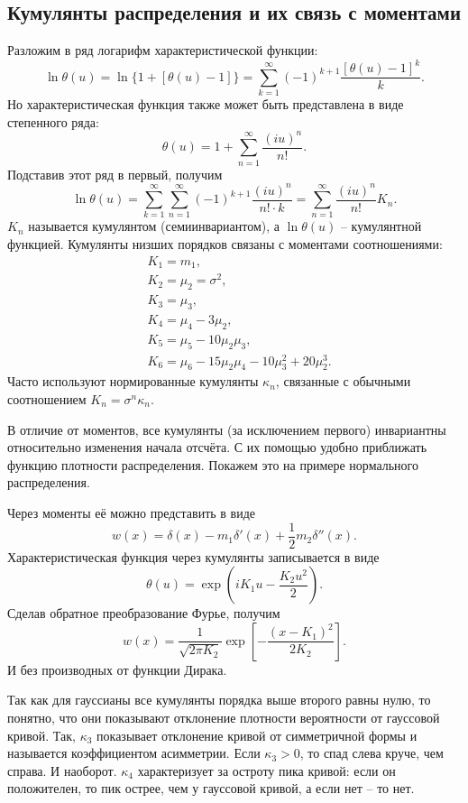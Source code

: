 \subsection{Кумулянты распределения и их связь с моментами}
Разложим в ряд логарифм характеристической функции:
\[
    \ln\theta(u) = \ln\{1 + [\theta(u) - 1]\} = \sum_{k=1}^\infty
    (-1)^{k+1}\frac{[\theta(u) - 1]^k}{k}.
\]
Но характеристическая функция также может быть представлена в виде степенного
ряда:
\[
    \theta(u) = 1 + \sum_{n=1}^\infty \frac{(iu)^n}{n!}.
\]
Подставив этот ряд в первый, получим
\[
    \ln\theta(u) = \sum_{k=1}^\infty \sum_{n=1}^\infty
    (-1)^{k+1}\frac{(iu)^n}{n! \cdot k} =
    \sum_{n=1}^\infty\frac{(iu)^n}{n!}K_n.
\]
\( K_n \) называется кумулянтом (семиинвариантом), а \( \ln\theta(u) \) --
кумулянтной функцией. Кумулянты низших порядков связаны с моментами
соотношениями:
\begin{align*}
    & K_1 = m_1, \\
    & K_2 = \mu_2 = \sigma^2, \\
    & K_3 = \mu_3, \\
    & K_4 = \mu_4 - 3\mu_2, \\
    & K_5 = \mu_5 - 10\mu_2\mu_3, \\
    & K_6 = \mu_6 - 15\mu_2\mu_4 - 10\mu_3^2 + 20\mu_2^3.
\end{align*}
Часто используют нормированные кумулянты \( \kappa_n \), связанные с обычными
соотношением \( K_n = \sigma^n\kappa_n \).

В отличие от моментов, все кумулянты (за исключением первого) инвариантны
относительно изменения начала отсчёта. С их помощью удобно приближать функцию
плотности распределения. Покажем это на примере нормального распределения.

Через моменты её можно представить в виде
\[
    w(x) = \delta(x) - m_1\delta'(x) + \frac{1}{2}m_2\delta''(x).
\]
Характеристическая функция через кумулянты записывается в виде
\[
    \theta(u) = \exp\left( iK_1u - \frac{K_2u^2}{2} \right).
\]
Сделав обратное преобразование Фурье, получим
\[
    w(x) = \frac{1}{\sqrt{2\pi K_2}}\exp\left[ -\frac{(x-K_1)^2}{2K_2} \right].
\]
И без производных от функции Дирака.

Так как для гауссианы все кумулянты порядка выше второго равны нулю, то понятно,
что они показывают отклонение плотности вероятности от гауссовой кривой. Так,
\( \kappa_3 \) показывает отклонение кривой от симметричной формы и называется
коэффициентом асимметрии. Если \( \kappa_3 > 0  \), то спад слева круче, чем
справа. И наоборот. \( \kappa_4 \) характеризует за остроту пика кривой: если он
положителен, то пик острее, чем у гауссовой кривой, а если нет -- то нет.

